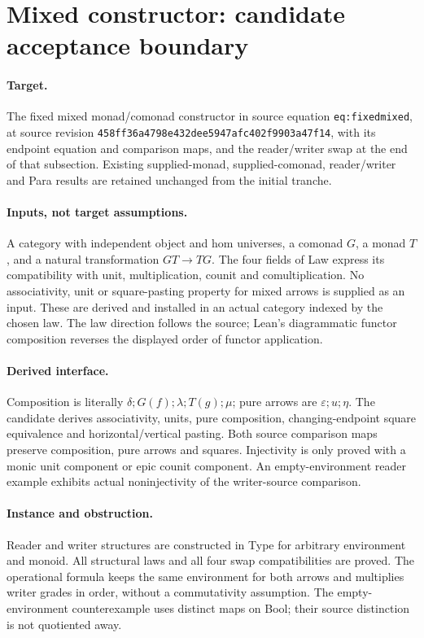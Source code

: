 \documentclass{article}
\begin{document}
\section*{Mixed constructor: candidate acceptance boundary}
\paragraph{Target.} The fixed mixed monad/comonad constructor in source equation \texttt{eq:fixedmixed}, at source revision \texttt{458ff36a4798e432dee5947afc402f9903a47f14}, with its endpoint equation and comparison maps, and the reader/writer swap at the end of that subsection. Existing supplied-monad, supplied-comonad, reader/writer and Para results are retained unchanged from the initial tranche.
\paragraph{Inputs, not target assumptions.} A category with independent object and hom universes, a comonad $G$, a monad $T$, and a natural transformation $GT\to TG$. The four fields of Law express its compatibility with unit, multiplication, counit and comultiplication. No associativity, unit or square-pasting property for mixed arrows is supplied as an input. These are derived and installed in an actual category indexed by the chosen law. The law direction follows the source; Lean's diagrammatic functor composition reverses the displayed order of functor application.
\paragraph{Derived interface.} Composition is literally $\delta;G(f);\lambda;T(g);\mu$; pure arrows are $\varepsilon;u;\eta$. The candidate derives associativity, units, pure composition, changing-endpoint square equivalence and horizontal/vertical pasting. Both source comparison maps preserve composition, pure arrows and squares. Injectivity is only proved with a monic unit component or epic counit component. An empty-environment reader example exhibits actual noninjectivity of the writer-source comparison.
\paragraph{Instance and obstruction.} Reader and writer structures are constructed in Type for arbitrary environment and monoid. All structural laws and all four swap compatibilities are proved. The operational formula keeps the same environment for both arrows and multiplies writer grades in order, without a commutativity assumption. The empty-environment counterexample uses distinct maps on Bool; their source distinction is not quotiented away.
\end{document}

